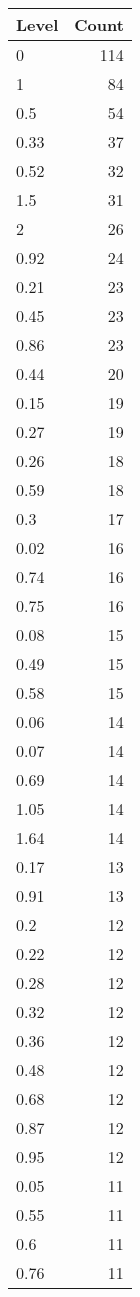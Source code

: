 \begin{table}[ht]
\centering
\begin{tabular}{lr}
  \hline
Level & Count \\ 
  \hline
0 & 114 \\ 
  1 &  84 \\ 
  0.5 &  54 \\ 
  0.33 &  37 \\ 
  0.52 &  32 \\ 
  1.5 &  31 \\ 
  2 &  26 \\ 
  0.92 &  24 \\ 
  0.21 &  23 \\ 
  0.45 &  23 \\ 
  0.86 &  23 \\ 
  0.44 &  20 \\ 
  0.15 &  19 \\ 
  0.27 &  19 \\ 
  0.26 &  18 \\ 
  0.59 &  18 \\ 
  0.3 &  17 \\ 
  0.02 &  16 \\ 
  0.74 &  16 \\ 
  0.75 &  16 \\ 
  0.08 &  15 \\ 
  0.49 &  15 \\ 
  0.58 &  15 \\ 
  0.06 &  14 \\ 
  0.07 &  14 \\ 
  0.69 &  14 \\ 
  1.05 &  14 \\ 
  1.64 &  14 \\ 
  0.17 &  13 \\ 
  0.91 &  13 \\ 
  0.2 &  12 \\ 
  0.22 &  12 \\ 
  0.28 &  12 \\ 
  0.32 &  12 \\ 
  0.36 &  12 \\ 
  0.48 &  12 \\ 
  0.68 &  12 \\ 
  0.87 &  12 \\ 
  0.95 &  12 \\ 
  0.05 &  11 \\ 
  0.55 &  11 \\ 
  0.6 &  11 \\ 
  0.76 &  11 \\ 

\end{tabular}
\end{table}
